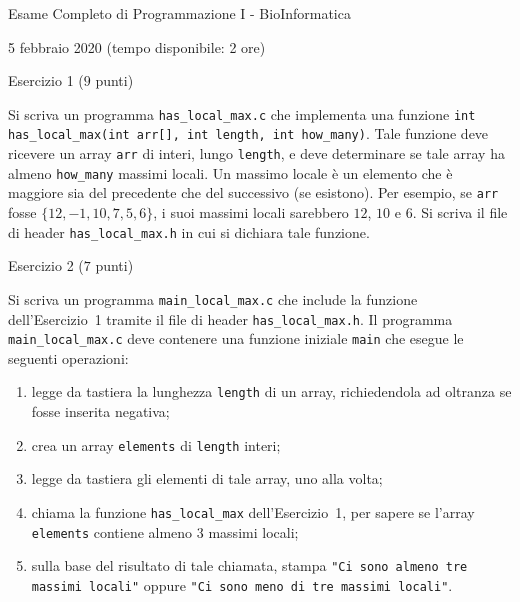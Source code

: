 \documentclass[12pt]{article}
\begin{document}
\begin{center}{\LARGE Esame Completo di Programmazione I - BioInformatica}\\
\vspace*{-2ex}
\begin{center}
  \large 5 febbraio 2020 (tempo disponibile: 2 ore)
\end{center}
\end{center}

\vspace*{1ex}
\begin{center}{\Large Esercizio 1} ($9$ punti)
\end{center}
Si scriva un programma \texttt{has\_local\_max.c} che implementa una funzione \texttt{int has\_local\_max(int arr[], int length, int how\_many)}. Tale funzione deve ricevere un array \texttt{arr} di interi, lungo \texttt{length}, e deve determinare se tale array ha almeno \texttt{how\_many} massimi locali. Un massimo locale \`e un elemento che \`e maggiore sia del precedente che del successivo (se esistono). Per esempio, se \texttt{arr} fosse $\{12,-1,10,7,5,6\}$, i suoi massimi locali sarebbero $12$, $10$ e $6$. Si scriva il file di header \texttt{has\_local\_max.h} in cui si dichiara tale funzione.

\vspace*{1ex}
\begin{center}{\Large Esercizio 2} ($7$ punti)\end{center}
%
Si scriva un programma \texttt{main\_local\_max.c} che include la funzione dell'Esercizio~1 tramite
il file di header \texttt{has\_local\_max.h}.
Il programma \texttt{main\_local\_max.c} deve contenere una funzione iniziale \texttt{main} che esegue
le seguenti operazioni:
\begin{enumerate}
\item legge da tastiera la lunghezza \texttt{length} di un array, richiedendola ad oltranza se fosse inserita negativa;
\item crea un array \texttt{elements} di \texttt{length} interi;
\item legge da tastiera gli elementi di tale array, uno alla volta;
\item chiama la funzione \texttt{has\_local\_max} dell'Esercizio~1, per sapere se l'array
  \texttt{elements} contiene almeno $3$ massimi locali;
\item sulla base del risultato di tale chiamata, stampa \texttt{"Ci sono almeno tre massimi locali"}
  oppure \texttt{"Ci sono meno di tre massimi locali"}.
\end{enumerate}
\end{document}
